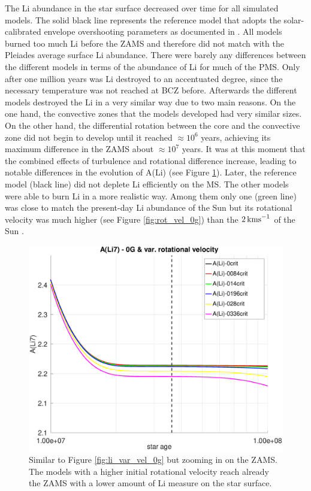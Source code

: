 \documentclass[fleqn,usenatbib]{mnras}
\begin{document}
\begin{ceqn}
The Li abundance in the star surface decreased over time for all simulated models. The solid black line represents the reference model that adopts the solar-calibrated envelope overshooting parameters as documented in \citet{Choi2016}. All models burned too much Li before the ZAMS and therefore did not match with the Pleiades average surface Li abundance. There were barely any differences between the different models in terms of the abundance of Li for much of the PMS. Only after one million years was Li destroyed to an accentuated degree, since the necessary temperature was not reached at BCZ before. Afterwards the different models destroyed the Li in a very similar way due to two main reasons. On the one hand, the convective zones that the models developed had very similar sizes. On the other hand, the differential rotation between the core and the convective zone did not begin to develop until it reached $ \approx 10^6$ years, achieving its maximum difference in the ZAMS about $ \approx 10^7$ years. It was at this moment that the combined effects of turbulence and rotational difference increase, leading to notable differences in the evolution of A(Li) (see Figure \ref{fig:li_var_vel_0g_z1}). Later, the reference model (black line) did not deplete Li efficiently on the MS. The other models were able to burn Li in a more realistic way. Among them only one (green line) was close to match the present-day Li abundance of the Sun but its rotational velocity was much higher (see Figure \ref{fig:rot_vel_0g}) than the $2\,\mathrm{kms}^{-1}$ of the Sun \citep{Gill2012}. \par

\begin{figure}
	\includegraphics[trim = 25mm 10mm 15mm 10mm clip,width=\columnwidth]{figures/paper1/li_var_vel_0_0g_z1.eps}
    \caption {Similar to Figure \ref{fig:li_var_vel_0g} but zooming in on the ZAMS. The models with a higher initial rotational velocity reach already the ZAMS with a lower amount of Li measure on the star surface.}
    \label{fig:li_var_vel_0g_z1}
\end{figure}


\end{ceqn}
\end{document}
